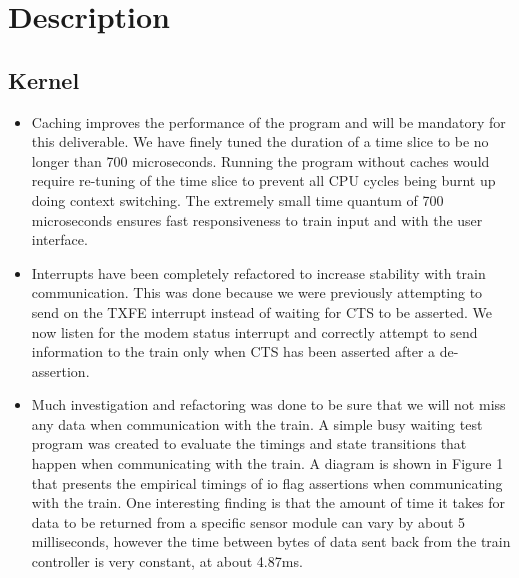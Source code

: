 \documentclass[letterpaper]{article}
\begin{document}
\section{Description%
  \label{description}%
}


\subsection{Kernel%
  \label{kernel}%
}
%
\begin{itemize}

\item Caching improves the performance of the program and will be mandatory for this deliverable.  We have finely tuned the duration of a time slice to be no longer than 700 microseconds.  Running the program without caches would require re-tuning of the time slice to prevent all CPU cycles being burnt up doing context switching.  The extremely small time quantum of 700 microseconds ensures fast responsiveness to train input and with the user interface.

\item Interrupts have been completely refactored to increase stability with train communication.  This was done because we were previously attempting to send on the TXFE interrupt instead of waiting for CTS to be asserted.  We now listen for the modem status interrupt and correctly attempt to send information to the train only when CTS has been asserted after a de-assertion.

\item Much investigation and refactoring was done to be sure that we will not miss any data when communication with the train.  A simple busy waiting test program was created to evaluate the timings and state transitions that happen when communicating with the train.  A diagram is shown in Figure 1 that presents the empirical timings of io flag assertions when communicating with the train.  One interesting finding is that the amount of time it takes for data to be returned from a specific sensor module can vary by about 5 milliseconds, however the time between bytes of data sent back from the train controller is very constant, at about 4.87ms.

\end{itemize}
\end{document}
